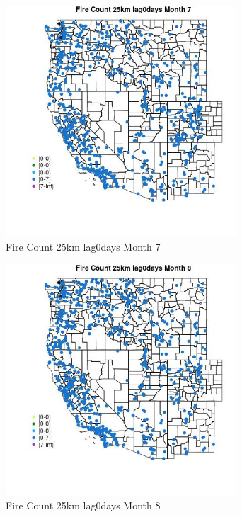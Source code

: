 \begin{figure} 
\centering  
\includegraphics[width=0.77\textwidth]{Code_Outputs/Report_ML_input_PM25_Step4_part_e_de_duplicated_aves_compiled_2019-05-21wNAs_MapObsMo7Fire_Count_25km_lag0days.jpg} 
\caption{\label{fig:Report_ML_input_PM25_Step4_part_e_de_duplicated_aves_compiled_2019-05-21wNAsMapObsMo7Fire_Count_25km_lag0days}Fire Count 25km lag0days Month 7} 
\end{figure} 
 

\clearpage 

\begin{figure} 
\centering  
\includegraphics[width=0.77\textwidth]{Code_Outputs/Report_ML_input_PM25_Step4_part_e_de_duplicated_aves_compiled_2019-05-21wNAs_MapObsMo8Fire_Count_25km_lag0days.jpg} 
\caption{\label{fig:Report_ML_input_PM25_Step4_part_e_de_duplicated_aves_compiled_2019-05-21wNAsMapObsMo8Fire_Count_25km_lag0days}Fire Count 25km lag0days Month 8} 
\end{figure} 
 

